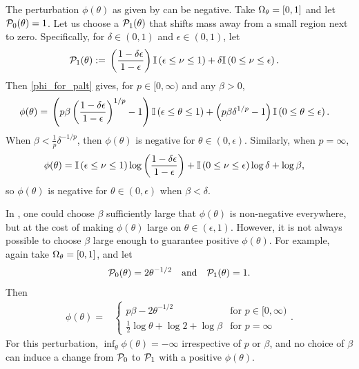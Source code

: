 \begin{ex}
%
The perturbation $\phi(\theta)$ as given by  can be
negative. Take $\Omega_{\theta} = [0,1]$ and let $\mathcal{P}_{0}(\theta) = 1$. Let us choose a
$\mathcal{P}_{1}(\theta)$ that shifts mass away from a small region next to zero.
Specifically, for  $\delta \in (0, 1)$ and $\epsilon \in (0, 1)$, let
%
\begin{align*}
%
\palt(\theta) :={}&
    \left(\frac{1-\delta \epsilon}{1 - \epsilon} \right)
        \ind{\epsilon \le \nu \le 1} +
    \delta \ind{0 \le \nu \le \epsilon}.
%
\end{align*}
%
Then \eqref{phi_for_palt} gives, for $p \in [0, \infty)$ and any $\beta > 0$,
%
\begin{align*}
%
\phi(\theta) ={}&
    \left( p \beta\left(\frac{1-\delta \epsilon}{1-\epsilon} \right)^{1/p}
        - 1
    \right)
        \ind{\epsilon \le \theta \le 1} +
    \left(p \beta \delta^{1/p} - 1 \right) \ind{0 \le \theta \le \epsilon}.
%
\end{align*}
%
When $\beta < \frac{1}{p} \delta^{-1/p}$, then $\phi(\theta)$ is negative for
$\theta \in (0, \epsilon)$.  Similarly, when $p = \infty$,
%
\begin{align*}
%
\phi(\theta) ={}&
    \ind{\epsilon \le \nu \le 1}
        \log \left(\frac{1-\delta \epsilon}{1 - \epsilon} \right) +
    \ind{0 \le \nu \le \epsilon} \log \delta + \log \beta,
%
\end{align*}
%
so $\phi(\theta)$ is negative for $\theta \in (0, \epsilon)$ when
$\beta < \delta$.

\end{ex}

\begin{ex}
%
In , one could choose $\beta$ sufficiently large that
$\phi(\theta)$ is non-negative everywhere, but at the cost of making
$\phi(\theta)$ large on $\theta \in (\epsilon, 1)$. However, it is not always
possible to choose $\beta$ large enough to guarantee positive $\phi(\theta)$.
For example, again take $\Omega_{\theta}=[0,1]$, and let
%
\begin{align*}
%
\pbase(\theta) ={} 2 \theta^{-1/2} \mathand
\palt(\theta) ={} 1.
%
\end{align*}
%
Then
%
\begin{align*}
%
\phi(\theta) ={}&
\begin{cases}
        p\beta - 2 \theta^{-1/2} & \textrm{for }p \in [0, \infty) \\
        \frac{1}{2} \log \theta + \log 2 + \log \beta
            & \textrm{for }p = \infty
\end{cases}.
%
\end{align*}
%
For this perturbation, $\inf_\theta \phi(\theta) = -\infty$ irrespective
of $p$ or $\beta$, and no choice of $\beta$ can induce a change from
$\mathcal{P}_{0}$ to $\mathcal{P}_{1}$ with a positive $\phi(\theta)$.
%
\end{ex}

